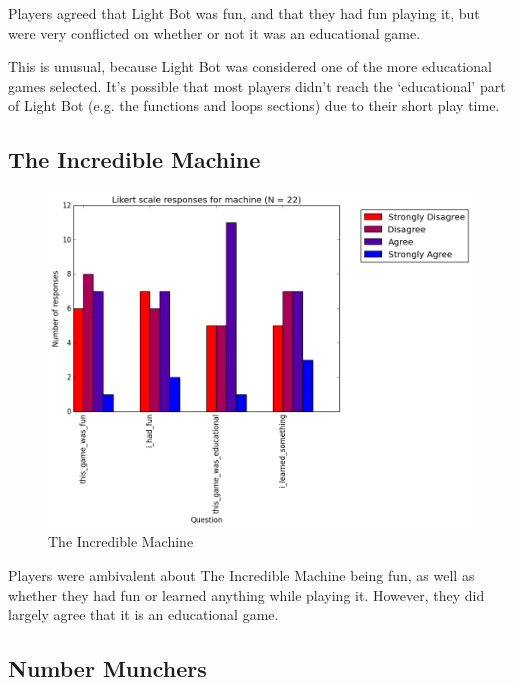 				Players agreed that Light Bot was fun, and that they had fun playing it, but were very conflicted on whether or not it was an educational game. 

				This is unusual, because Light Bot was considered one of the more educational games selected. It's possible that most players didn't reach the `educational' part of Light Bot (e.g. the functions and loops sections) due to their short play time.

			\subsection{The Incredible Machine}

				\begin{figure}[] 
				\centering 
				\includegraphics[width=\textwidth, height=.4\textheight, keepaspectratio=true]{machine_likert.png} 
				\caption{The Incredible Machine}
				\end{figure}

				Players were ambivalent about The Incredible Machine being fun, as well as whether they had fun or learned anything while playing it. However, they did largely agree that it is an educational game.

			\subsection{Number Munchers}

